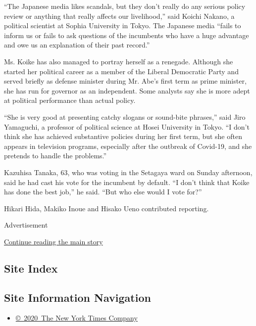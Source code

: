 ``The Japanese media likes scandals, but they don't really do any
serious policy review or anything that really affects our livelihood,''
said Koichi Nakano, a political scientist at Sophia University in Tokyo.
The Japanese media ``fails to inform us or fails to ask questions of the
incumbents who have a huge advantage and owe us an explanation of their
past record.''

Ms. Koike has also managed to portray herself as a renegade. Although
she started her political career as a member of the Liberal Democratic
Party and served briefly as defense minister during Mr. Abe's first term
as prime minister, she has run for governor as an independent. Some
analysts say she is more adept at political performance than actual
policy.

``She is very good at presenting catchy slogans or sound-bite phrases,''
said Jiro Yamaguchi, a professor of political science at Hosei
University in Tokyo. ``I don't think she has achieved substantive
policies during her first term, but she often appears in television
programs, especially after the outbreak of Covid-19, and she pretends to
handle the problems.''

Kazuhisa Tanaka, 63, who was voting in the Setagaya ward on Sunday
afternoon, said he had cast his vote for the incumbent by default. ``I
don't think that Koike has done the best job,'' he said. ``But who else
would I vote for?''

Hikari Hida, Makiko Inoue and Hisako Ueno contributed reporting.

Advertisement

\protect\hyperlink{after-bottom}{Continue reading the main story}

\hypertarget{site-index}{%
\subsection{Site Index}\label{site-index}}

\hypertarget{site-information-navigation}{%
\subsection{Site Information
Navigation}\label{site-information-navigation}}

\begin{itemize}
\tightlist
\item
  \href{https://help.nytimes3xbfgragh.onion/hc/en-us/articles/115014792127-Copyright-notice}{©~2020~The
  New York Times Company}
\end{itemize}

